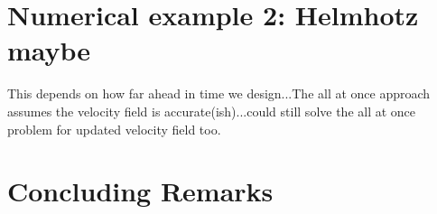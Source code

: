 \documentclass[12pt]{article}
\begin{document}
\section{Numerical example 2: Helmhotz maybe} 
This depends on how far ahead in time we design...The all at once approach assumes the velocity field is accurate(ish)...could still solve the all at once problem for updated velocity field too. 



\section{Concluding Remarks}








\end{document}
